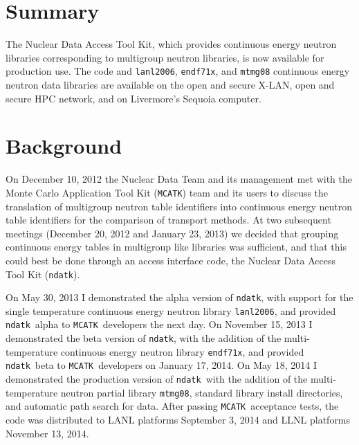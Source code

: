 \documentclass[12pt]{lamemo}
\date{November 14, 2014}
\newcommand{\ndatk}{\texttt{ndatk}}
\newcommand{\MCATK}{\texttt{MCATK}}
\begin{document}
\lstset{language=C++}

\maketitle			%

\section{Summary}
The Nuclear Data Access Tool Kit, which provides continuous energy
neutron libraries corresponding to multigroup neutron libraries, is
now available for production use.  The code and \texttt{lanl2006},
\texttt{endf71x}, and \texttt{mtmg08} continuous energy neutron data
libraries are available on the open and secure X-LAN, open and secure
HPC network, and on Livermore's Sequoia computer.

\section{Background}

On December 10, 2012 the Nuclear Data Team and its management met with
the Monte Carlo Application Tool Kit\cite{adams14} (\MCATK) team and
its users to discuss the translation of multigroup neutron table
identifiers into continuous energy neutron table identifiers for the
comparison of transport methods.  At two subsequent meetings (December
20, 2012 and January 23, 2013) we decided that grouping continuous
energy tables in multigroup like libraries was sufficient, and that
this could best be done through an access interface code, the Nuclear
Data Access Tool Kit (\ndatk).

On May 30, 2013 I demonstrated the alpha version of \ndatk, with
support for the single temperature continuous energy neutron library
\texttt{lanl2006}, and provided \ndatk\ alpha to \MCATK\ developers
the next day.  On November 15, 2013 I demonstrated the beta version of
\ndatk, with the addition of the multi-temperature continuous energy
neutron library \texttt{endf71x}, and provided \ndatk\ beta to
\MCATK\ developers on January 17, 2014.  On May 18, 2014 I
demonstrated the production version of \ndatk\ with the addition of
the multi-temperature neutron partial library \texttt{mtmg08}, standard
library install directories, and automatic path search for data.
After passing \MCATK\ acceptance tests, the code was distributed to
LANL platforms September 3, 2014 and LLNL platforms November 13, 2014.
\end{document}
